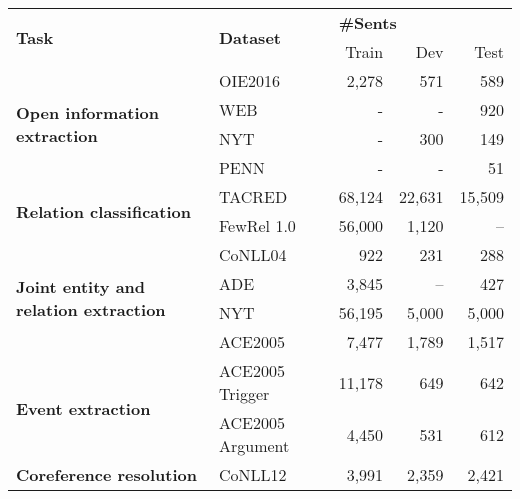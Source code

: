 \begin{table}[t]
\centering
\resizebox{\linewidth}{!}
  {
  \begin{tabular} {l | l | r r r}
    \toprule
    \multirow{2}{*}{{\bf Task}} & \multirow{2}{*}{{\bf Dataset}} & \multicolumn{3}{l}{{\bf \#Sents}} \\
    & & Train & Dev & Test \\
    \hline
    \multirow{4}{*}{{\small \bf Open information extraction}}
                                    & OIE2016                           &  2,278  &    571 &     589 \\
                                    & WEB                               &       - &      - &     920 \\
                                    & NYT                               &       - &    300 &     149 \\
                                    & PENN                              &       - &      - &      51 \\
    \hline
    \multirow{2}{*}{{\small \bf Relation classification}}
                                    & TACRED                            & 	68,124  & 22,631 &   15,509 \\
                                    & FewRel 1.0                            & 56,000  &      1,120 &  --  \\
    \hline
    \multirow{4}{*}{{\small \bf Joint entity and relation extraction}}    
                                    & CoNLL04                           &     922 &    231 &    288 \\
                                    & ADE                               &   3,845 &    --  &    427 \\
                                    & NYT                               &  56,195 &  5,000 &  5,000 \\
                                    & ACE2005                           &   7,477 &  1,789 &  1,517 \\
    \hline
    \multirow{2}{*}{{\small \bf Event extraction}}
                                    & ACE2005 Trigger                     &  11,178 &    649 &    642 \\
                                    & ACE2005 Argument                     &   4,450 &    531 &    612 \\
    \hline
                    {\small \bf Coreference resolution}
                                    & CoNLL12                           &   3,991 &  2,359 &  2,421 \\

\end{tabular}}
\end{table}
